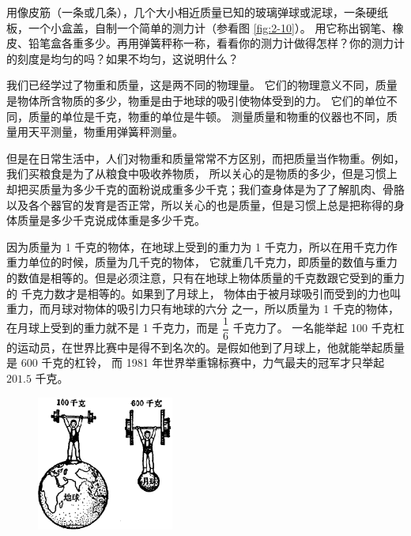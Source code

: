 用像皮筋（一条或几条），几个大小相近质量已知的玻璃弹球或泥球，一条硬纸板，一个小盒盖，自制一个简单的测力计（参看图 \ref{fig:2-10}）。
用它称出钢笔、橡皮、铅笔盒各重多少。再用弹簧秤称一称，看看你的测力计做得怎样？你的测力计的刻度是均匀的吗？如果不均匀，这说明什么？



我们已经学过了物重和质量，这是两不同的物理量。
它们的物理意义不同，质量是物体所含物质的多少，物重是由于地球的吸引使物体受到的力。
它们的单位不同，质量的单位是千克，物重的单位是牛顿。
测量质量和物重的仪器也不同，质量用天平测量，物重用弹簧秤测量。

但是在日常生活中，人们对物重和质量常常不方区别，而把质量当作物重。例如，我们买粮食是为了从粮食中吸收养物质，
所以关心的是物质的多少，但是习惯上却把买质量为多少千克的面粉说成重多少千克；我们查身体是为了了解肌肉、骨胳
以及各个器官的发育是否正常，所以关心的也是质量，但是习惯上总是把称得的身体质量是多少千克说成体重是多少千克。

因为质量为 1 千克的物体，在地球上受到的重力为 1 千克力，所以在用千克力作重力单位的时候，质量为几千克的物体，
它就重几千克力，即质量的数值与重力的数值是相等的。但是必须注意，只有在地球上物体质量的千克数跟它受到的重力的
千克力数才是相等的。如果到了月球上， 物体由于被月球吸引而受到的力也叫重力，而月球对物体的吸引力只有地球的六分
之一，所以质量为 1 千克的物体，在月球上受到的重力就不是 1 千克力，而是 $\dfrac{1}{6}$ 千克力了。
一名能举起 100 千克杠的运动员，在世界比赛中是得不到名次的。是假如他到了月球上，他就能举起质量是 600 千克的杠铃，
而 1981 年世界举重锦标赛中，力气最夫的冠军才只举起 $201.5$ 千克。

\begin{figure}[H]
    \centering
    \includegraphics[width=0.4\textwidth]{../pic/czwl1-ch2-11}
    \caption{}\label{fig:2-11}
\end{figure}

